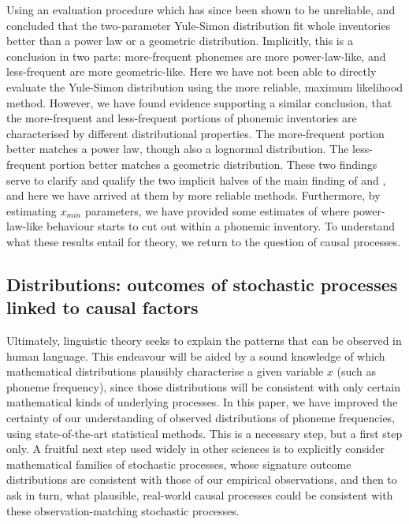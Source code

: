 Using an evaluation procedure which has since been shown to be unreliable, \textcite{martindale_comparison_1996} and \textcite{tambovtsev_phoneme_2007} concluded that the two-parameter Yule-Simon distribution fit whole inventories better than a power law or a geometric distribution. Implicitly, this is a conclusion in two parts: more-frequent phonemes are more power-law-like, and less-frequent are more geometric-like. Here we have not been able to directly evaluate the Yule-Simon distribution using the more reliable, maximum likelihood method. However, we have found evidence supporting a similar conclusion, that the more-frequent and less-frequent portions of phonemic inventories are characterised by different distributional properties. The more-frequent portion better matches a power law, though also a lognormal distribution. The less-frequent portion better matches a geometric distribution. These two findings serve to clarify and qualify the two implicit halves of the main finding of \textcite{martindale_comparison_1996} and \textcite{tambovtsev_phoneme_2007}, and here we have arrived at them by more reliable methods. Furthermore, by estimating \(x_{min}\) parameters, we have provided some estimates of where power-law-like behaviour starts to cut out within a phonemic inventory. To understand what these results entail for theory, we return to the question of causal processes.

\hypertarget{distributions-outcomes-of-stochastic-processes-linked-to-causal-factors}{%
\subsection{Distributions: outcomes of stochastic processes linked to causal factors}\label{distributions-outcomes-of-stochastic-processes-linked-to-causal-factors}}

Ultimately, linguistic theory seeks to explain the patterns that can be observed in human language. This endeavour will be aided by a sound knowledge of which mathematical distributions plausibly characterise a given variable \(x\) (such as phoneme frequency), since those distributions will be consistent with only certain mathematical kinds of underlying processes. In this paper, we have improved the certainty of our understanding of observed distributions of phoneme frequencies, using state-of-the-art statistical methods. This is a necessary step, but a first step only. A fruitful next step used widely in other sciences is to explicitly consider mathematical families of stochastic processes, whose signature outcome distributions are consistent with those of our empirical observations, and then to ask in turn, what plausible, real-world causal processes could be consistent with these observation-matching stochastic processes.

